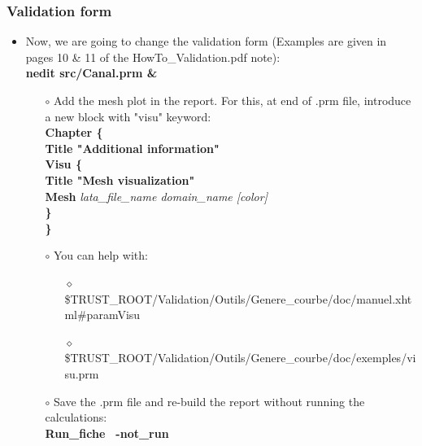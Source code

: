 \documentclass[10pt, hyperref={unicode=true,pdfusetitle, bookmarks=true,bookmarksnumbered=false,bookmarksopen=false, breaklinks=false,pdfborder={0 0 1},backref=true,colorlinks=true,linkcolor=darkblue,pageanchor}]{beamer}
\begin{document}
\begin{frame}
\frametitle{Validation form}
\begin{block}{}

\begin{itemize}
\item Now, we are going to change the validation form (Examples are given in pages 10 \& 11 of the HowTo\_Validation.pdf note):\\
\textbf{nedit src/Canal.prm \&}
    \begin{itemize}
    \item [$\circ$] Add the mesh plot in the report. For this, at end of .prm file, introduce a new block with "visu" keyword:\\
    \textbf{Chapter \{ }  \\
    \hspace{0.3cm} \textbf{Title "Additional information"} \\
    \hspace{0.3cm} \textbf{Visu \{ } \\
    \hspace{0.6cm} \textbf{Title "Mesh visualization" } \\
    \hspace{0.6cm} \textbf{Mesh} \textit {lata\_file\_name  domain\_name [color]} \\
    \hspace{0.3cm} \textbf{\} } \\
    \textbf{\} } \\
    \item [$\circ$] You can help with:
        \begin{itemize}
        \item [$\diamond$] {\scriptsize{\$TRUST\_ROOT/Validation/Outils/Genere\_courbe/doc/manuel.xhtml\#paramVisu}}
        \item [$\diamond$] {\scriptsize{\$TRUST\_ROOT/Validation/Outils/Genere\_courbe/doc/exemples/visu.prm}}
        \end{itemize}
    \item [$\circ$] Save the .prm file and re-build the report without running the calculations:\\
    \textbf{Run\_fiche \, -not\_run} \\
    \end{itemize}
\end{itemize}

\end{block}
\end{frame}
\end{document}
